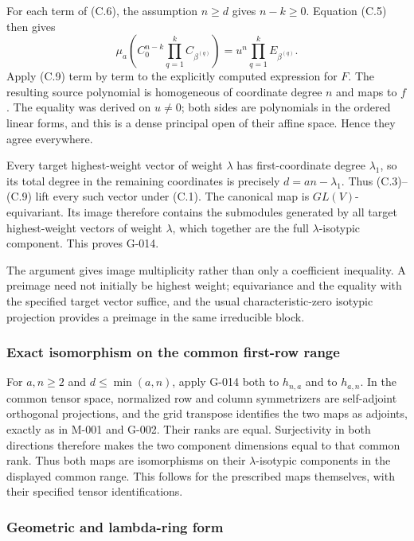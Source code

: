 \documentclass[
  10pt,
]{article}
\begin{document}
For each term of (C.6), the assumption \(n\ge d\) gives \(n-k\ge0\).
Equation (C.5) then gives \[
 \mu_a\left(C_0^{n-k}\prod_{q=1}^k C_{\beta^{(q)}}\right)
 =u^n\prod_{q=1}^k E_{\beta^{(q)}}.
\tag{C.9}
\] Apply (C.9) term by term to the explicitly computed expression for
\(F\). The resulting source polynomial is homogeneous of coordinate
degree \(n\) and maps to \(f\). The equality was derived on \(u\ne0\);
both sides are polynomials in the ordered linear forms, and this is a
dense principal open of their affine space. Hence they agree everywhere.

Every target highest-weight vector of weight \(\lambda\) has
first-coordinate degree \(\lambda_1\), so its total degree in the
remaining coordinates is precisely \(d=an-\lambda_1\). Thus (C.3)--(C.9)
lift every such vector under (C.1). The canonical map is
\(GL(V)\)-equivariant. Its image therefore contains the submodules
generated by all target highest-weight vectors of weight \(\lambda\),
which together are the full \(\lambda\)-isotypic component. This proves
G-014.

The argument gives image multiplicity rather than only a coefficient
inequality. A preimage need not initially be highest weight;
equivariance and the equality with the specified target vector suffice,
and the usual characteristic-zero isotypic projection provides a
preimage in the same irreducible block.

\subsubsection{Exact isomorphism on the common first-row
range}\label{exact-isomorphism-on-the-common-first-row-range}

For \(a,n\ge2\) and \(d\le\min(a,n)\), apply G-014 both to \(h_{n,a}\)
and to \(h_{a,n}\). In the common tensor space, normalized row and
column symmetrizers are self-adjoint orthogonal projections, and the
grid transpose identifies the two maps as adjoints, exactly as in M-001
and G-002. Their ranks are equal. Surjectivity in both directions
therefore makes the two component dimensions equal to that common rank.
Thus both maps are isomorphisms on their \(\lambda\)-isotypic components
in the displayed common range. This follows for the prescribed maps
themselves, with their specified tensor identifications.

\subsubsection{Geometric and lambda-ring
form}\label{geometric-and-lambda-ring-form}
\end{document}
